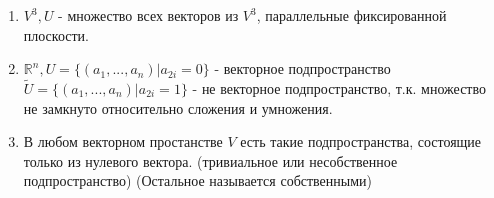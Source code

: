 \documentclass[a4paper, 12pt]{article}
\newcommand{\R}{\mathbb R}
\theoremstyle{definition}
\begin{document}
    \begin{enumerate} 
      \item $V^3, U$ - множество всех векторов из $V^3$, параллельные фиксированной плоскости.
      \item $\R^n, U=\{(a_1,..., a_n) | a_{2i} = 0\}$ - векторное подпространство \\ $\widetilde{U} = \{(a_1,..., a_n) | a_{2i} = 1\}$ - не векторное подпространство, т.к. множество не замкнуто относительно сложения и умножения.
      \item В любом векторном простанстве $V$ есть такие подпространства, состоящие только из нулевого вектора. (тривиальное или несобственное подпространство) (Остальное называется собственными)
    \end{enumerate}
  
  \newpage
\end{document}
